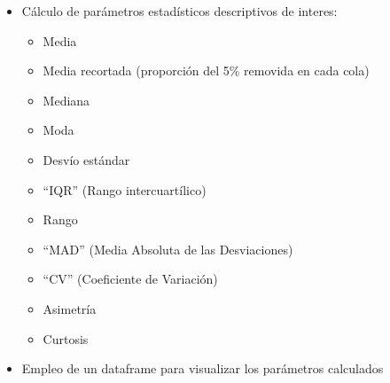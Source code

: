 \documentclass[11pt]{article}
\providecommand{\tightlist}{%
      \setlength{\itemsep}{0pt}\setlength{\parskip}{0pt}}
\begin{document}
    \begin{itemize}
\tightlist
\item
  Cálculo de parámetros estadísticos descriptivos de interes:

  \begin{itemize}
  \tightlist
  \item
    Media
  \item
    Media recortada (proporción del 5\% removida en cada cola)
  \item
    Mediana
  \item
    Moda
  \item
    Desvío estándar
  \item
    ``IQR'' (Rango intercuartílico)
  \item
    Rango
  \item
    ``MAD'' (Media Absoluta de las Desviaciones)
  \item
    ``CV'' (Coeficiente de Variación)
  \item
    Asimetría
  \item
    Curtosis
  \end{itemize}
\item
  Empleo de un dataframe para visualizar los parámetros calculados
\end{itemize}
\end{document}
